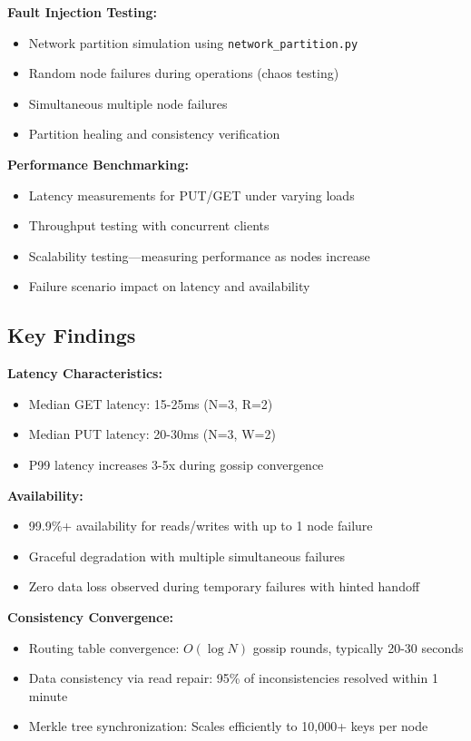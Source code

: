 \documentclass[conference]{IEEEtran}
\begin{document}
\textbf{Fault Injection Testing:}
\begin{itemize}
    \item Network partition simulation using \texttt{network\_partition.py}
    \item Random node failures during operations (chaos testing)
    \item Simultaneous multiple node failures
    \item Partition healing and consistency verification
\end{itemize}

\textbf{Performance Benchmarking:}
\begin{itemize}
    \item Latency measurements for PUT/GET under varying loads
    \item Throughput testing with concurrent clients
    \item Scalability testing—measuring performance as nodes increase
    \item Failure scenario impact on latency and availability
\end{itemize}

\subsection{Key Findings}
\textbf{Latency Characteristics:}
\begin{itemize}
    \item Median GET latency: 15-25ms (N=3, R=2)
    \item Median PUT latency: 20-30ms (N=3, W=2)
    \item P99 latency increases 3-5x during gossip convergence
\end{itemize}

\textbf{Availability:}
\begin{itemize}
    \item 99.9\%+ availability for reads/writes with up to 1 node failure
    \item Graceful degradation with multiple simultaneous failures
    \item Zero data loss observed during temporary failures with hinted handoff
\end{itemize}

\textbf{Consistency Convergence:}
\begin{itemize}
    \item Routing table convergence: $O(\log N)$ gossip rounds, typically 20-30 seconds
    \item Data consistency via read repair: 95\% of inconsistencies resolved within 1 minute
    \item Merkle tree synchronization: Scales efficiently to 10,000+ keys per node
\end{itemize}
\end{document}
